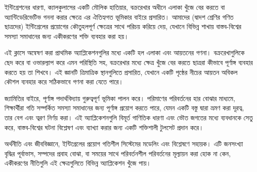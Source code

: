 ইন্টিগ্রেশনের ধারণা, ক্যালকুলাসের একটি মৌলিক হাতিয়ার, বক্ররেখার অধীনে এলাকা খুঁজে বের করতে বা অ্যান্টিডেরিভেটিভ গননা করার ক্ষেত্রে এর ঐতিহ্যগত ভূমিকার বাইরে প্রসারিত। আমাদের (দ্বাদশ শ্রেণির গণিত ছাত্রদের) ইন্টিগ্রেলের প্রয়োগের কৌতুহলপূর্ণ ক্ষেত্রের সাথে পরিচয় করিয়ে দেয়, যেখানে বিভিন্ন শাখায় বাস্তব-বিশ্বের সমস্যা সমাধানের জন্য একীকরণের শক্তি ব্যবহার করা হয়।

এই ক্লাসে অন্বেষণ করা প্রাথমিক অ্যাপ্লিকেশনগুলির মধ্যে একটি হল এলাকা এবং আয়তনের গণনা। বক্ররেখাগুলিকে ছেদ করে বা ওভারল্যাপ করে এমন পরিস্থিতি সহ, বক্ররেখার মধ্যে ক্ষেত্র খুঁজে বের করতে ছাত্ররা কীভাবে পূর্ণাঙ্গ ব্যবহার করতে হয় তা শিখবে। এই জ্ঞানটি ত্রিমাত্রিক স্থানগুলিতে প্রসারিত, যেখানে একটি পৃষ্ঠের নীচের আয়তন অবিকল কৌশল ব্যবহার করে সঠিকভাবে গণনা করা যেতে পারে।

জ্যামিতির বাইরে, পূর্ণাঙ্গ পদার্থবিদ্যায় গুরুত্বপূর্ণ ভূমিকা পালন করে। পরিমাণের পরিবর্তনের হার বোঝার মাধ্যমে, শিক্ষার্থীরা গতি সম্পর্কিত সমস্যা সমাধানের জন্য পূর্ণাঙ্গ প্রয়োগ করতে পারে, যেমন একটি বস্তু দ্বারা ভ্রমণ করা দূরত্ব, তার বেগ এবং ত্বরণ নির্ণয় করা। এই অ্যাপ্লিকেশনগুলি বিমূর্ত গাণিতিক ধারণা এবং ভৌত জগতের মধ্যে ব্যবধানকে সেতু করে, বাস্তব-বিশ্বের ঘটনা বিশ্লেষণ এবং ব্যাখ্যা করার জন্য একটি শক্তিশালী টুলসেট প্রদান করে।

অর্থনীতি এবং জীববিজ্ঞানে, ইন্টিগ্রেলের প্রয়োগ গতিশীল সিস্টেমের মডেলিং এবং বিশ্লেষণে সহায়ক। এটি জনসংখ্যা বৃদ্ধির পূর্বাভাস, সম্পদের প্রবাহ বোঝা, বা সময়ের সাথে পরিবর্তনশীল পরিবর্তনের মূল্যায়ন করা হোক না কেন, একীকরণের নীতিগুলি এই ক্ষেত্রগুলিতে বিভিন্ন অ্যাপ্লিকেশন খুঁজে পায়।
\newpage
